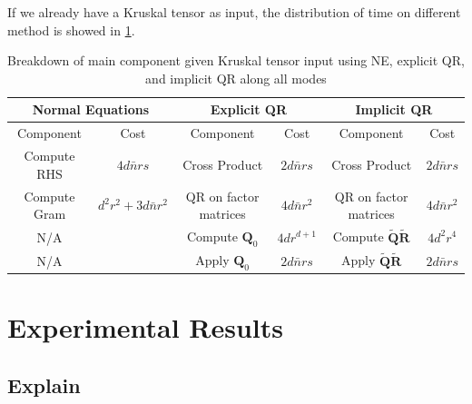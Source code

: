 \documentclass{article}
\newcommand{\mat}[1]{\mathbf{#1}}
\begin{document}
If we already have a Kruskal tensor as input, the distribution of time on different method is showed in \cref{tab:kruskal_its_part}.
\begin{table}[!ht] 
  \centering
  \begin{tabular}{|c|c|c|c|c|c|}
    \hline
    \multicolumn{2}{|c|}{\textbf{Normal Equations}} & \multicolumn{2}{|c|}{\textbf{Explicit QR}} & \multicolumn{2}{|c|}{\textbf{Implicit QR}} \\
    \hline
    Component & Cost & Component & Cost & Component & Cost \\
    \hline
    Compute RHS &$4d\bar n rs$ &  Cross Product&$2d\bar n rs$  & Cross Product &$2d\bar n rs$  \\
    Compute Gram & $d^2r^2+3d\bar n r^2$&QR on factor matrices & $4d \bar n r^2$ & QR on factor matrices & $4d \bar n r^2$\\
    N/A& &Compute $\mat{Q}_0$ & $4dr^{d+1}$& Compute $\tilde{\mat{Q}}\tilde{\mat{R}}$& $4d^2r^4$\\
    N/A & &Apply $\mat{Q}_0$& $2d\bar nrs$& Apply $\tilde{\mat{Q}}\tilde{\mat{R}}$& $2d \bar n rs$\\
    \hline
  \end{tabular}
  \caption{Breakdown of main component given Kruskal tensor input using NE, explicit QR, and implicit QR along all modes}
  \label{tab:kruskal_its_part}
\end{table}


  




\section{Experimental Results}
\subsection*{Explain}
\end{document}
